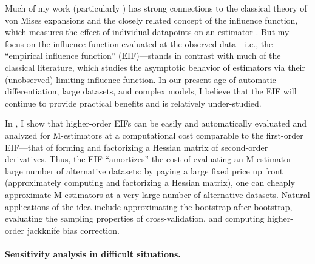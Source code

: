 Much of my work (particularly \citet{giordano:2019:ij, giordano:2020:amip,
giordano:2021:bayesij}) has strong connections to the classical theory of von
Mises expansions and the closely related concept of the influence function,
which measures the effect of individual datapoints on an estimator
\citep{mises:1947:asymptotic, reeds:1976:thesis, hampel:1986:robustbook,
serfling:2009:approximation}.  But my focus on the influence function
evaluated at the observed data---i.e., the ``empirical influence function''
(EIF)---stands in contrast with much of the classical literature, which studies
the asymptotic behavior of estimators via their (unobserved) limiting influence
function.
%
In our present age of automatic differentiation, large datasets, and complex
models, I believe that the EIF will continue to provide practical benefits and
is relatively under-studied.

In \citet{giordano:2019:hoij}, I show that higher-order EIFs can be
easily and automatically evaluated and analyzed for M-estimators at a
computational cost comparable to the first-order EIF---that of forming and
factorizing a Hessian matrix of second-order derivatives.
%
Thus, the EIF ``amortizes'' the cost of evaluating an M-estimator large number
of alternative datasets: by paying a large fixed price up front (approximately
computing and factorizing a Hessian matrix), one can cheaply approximate
M-estimators at a very large number of alternative datasets.  Natural
applications of the idea include approximating the bootstrap-after-bootstrap,
evaluating the sampling properties of cross-validation, and computing
higher-order jackknife bias correction.

\paragraph{Sensitivity analysis in difficult situations.}


